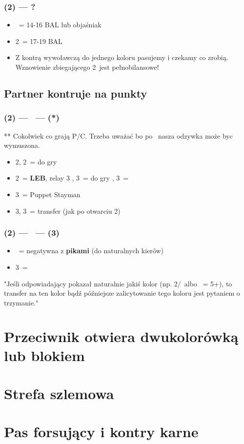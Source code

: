 \documentclass[12pt, a4paper]{article}
\newcommand{\leb}{\color{CadetBlue}\textbf{LEB}\color{black}}
\begin{document}
\subsubsection*{(2\diams*) --- ?}
\begin{itemize}
    \item \dbl\ = 14-16 BAL lub objaśniak
    \item 2\nt\ = 17-19 BAL
    \br
    \item Z kontrą wywoławczą do jednego koloru pasujemy i czekamy co zrobią.
    Wznowienie zbiegającego 2\hearts\ jest pełnobilansowe!
\end{itemize}

\subsection*{Partner kontruje na punkty}
\subsubsection*{(2\diams*) --- \dbl\ --- (\rdbl**)}
** Cokolwiek co grają P/C. Trzeba uważać bo po \pass\ nasza odzywka może byc wymuszona.
\begin{itemize}
    \item 2\hearts, 2\spades\ = do gry
    \item 2\nt\ = \leb, relay 3\clubs
    \subitem \pass, 3\diams\ = do gry
    \hearts, 3\spades\ = \inv
    \item 3\clubs\ = Puppet Stayman
    \item 3\diams, 3\hearts\ = transfer (jak po otwarciu 2\nt)
\end{itemize}

\subsubsection*{(2\diams*) --- \dbl\ --- (3\hearts)}
\begin{itemize}
    \item \dbl\ = negatywna z \textbf{pikami} (do naturalnych kierów)
    \item 3\spades\ = \gf
\end{itemize}

"Jeśli odpowiadający pokazał naturalnie jakiś kolor (np. 2\hearts/\spades\ albo \pass\ = 5+\diams),
 to transfer na ten kolor bądź późniejsze zalicytowanie tego koloru jest pytaniem o trzymanie."

\pagebreak
\section{Przeciwnik otwiera dwukolorówką lub blokiem}



\pagebreak
\section{Strefa szlemowa}


\pagebreak
\section{Pas forsujący i kontry karne}
\end{document}
